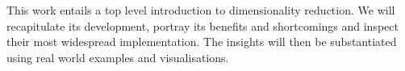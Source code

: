 
\begin{sciabstract}
This work entails a top level introduction to dimensionality reduction.
We will recapitulate its development, portray its benefits and shortcomings and inspect their most widespread implementation.
The insights will then be substantiated using real world examples and visualisations.
\end{sciabstract}

\clearpage
